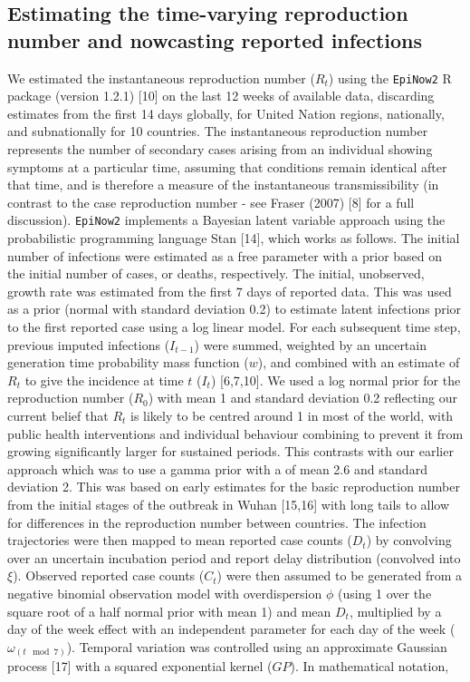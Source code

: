 \documentclass[
]{article}
\begin{document}
\hypertarget{estimating-the-time-varying-reproduction-number-and-nowcasting-reported-infections}{%
\subsection{Estimating the time-varying reproduction number and
nowcasting reported
infections}\label{estimating-the-time-varying-reproduction-number-and-nowcasting-reported-infections}}

We estimated the instantaneous reproduction number (\(R_t\)) using the
\texttt{EpiNow2} R package (version 1.2.1) {[}10{]} on the last 12 weeks
of available data, discarding estimates from the first 14 days globally,
for United Nation regions, nationally, and subnationally for 10
countries. The instantaneous reproduction number represents the number
of secondary cases arising from an individual showing symptoms at a
particular time, assuming that conditions remain identical after that
time, and is therefore a measure of the instantaneous transmissibility
(in contrast to the case reproduction number - see Fraser (2007) {[}8{]}
for a full discussion). \texttt{EpiNow2} implements a Bayesian latent
variable approach using the probabilistic programming language Stan
{[}14{]}, which works as follows. The initial number of infections were
estimated as a free parameter with a prior based on the initial number
of cases, or deaths, respectively. The initial, unobserved, growth rate
was estimated from the first 7 days of reported data. This was used as a
prior (normal with standard deviation 0.2) to estimate latent infections
prior to the first reported case using a log linear model. For each
subsequent time step, previous imputed infections (\(I_{t-1}\)) were
summed, weighted by an uncertain generation time probability mass
function (\(w\)), and combined with an estimate of \(R_t\) to give the
incidence at time \(t\) (\(I_t\)) {[}6,7,10{]}. We used a log normal
prior for the reproduction number (\(R_0\)) with mean 1 and standard
deviation 0.2 reflecting our current belief that \(R_t\) is likely to be
centred around 1 in most of the world, with public health interventions
and individual behaviour combining to prevent it from growing
significantly larger for sustained periods. This contrasts with our
earlier approach which was to use a gamma prior with a of mean 2.6 and
standard deviation 2. This was based on early estimates for the basic
reproduction number from the initial stages of the outbreak in Wuhan
{[}15,16{]} with long tails to allow for differences in the reproduction
number between countries. The infection trajectories were then mapped to
mean reported case counts (\(D_t\)) by convolving over an uncertain
incubation period and report delay distribution (convolved into
\(\xi\)). Observed reported case counts (\(C_t\)) were then assumed to
be generated from a negative binomial observation model with
overdispersion \(\phi\) (using 1 over the square root of a half normal
prior with mean 1) and mean \(D_t\), multiplied by a day of the week
effect with an independent parameter for each day of the week
(\(\omega_{(t \mod 7)}\)). Temporal variation was controlled using an
approximate Gaussian process {[}17{]} with a squared exponential kernel
(\(GP\)). In mathematical notation,
\end{document}
